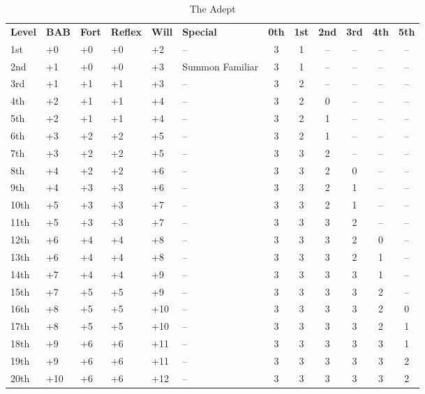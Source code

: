 \begin{table}[htb]
\caption{The Adept}
\centering
\begin{tabular}{*{6}{l}*{6}{c}}
\textbf{Level} & \textbf{BAB} & \textbf{Fort} & \textbf{Reflex} & \textbf{Will} & \textbf{Special} & \textbf{0th} & \textbf{1st} & \textbf{2nd} & \textbf{3rd} & \textbf{4th} & \textbf{5th}\\
1st & +0 & +0 & +0 & +2 & -- & 3 & 1 & -- & -- & -- & -- \\
2nd & +1 & +0 & +0 & +3 & Summon Familiar & 3 & 1 & -- & -- & -- & -- \\
3rd & +1 & +1 & +1 & +3 & -- & 3 & 2 & -- & -- & -- & -- \\
4th & +2 & +1 & +1 & +4 & -- & 3 & 2 & 0 & -- & -- & -- \\
5th & +2 & +1 & +1 & +4 & -- & 3 & 2 & 1 & -- & -- & -- \\
6th & +3 & +2 & +2 & +5 & -- & 3 & 2 & 1 & -- & -- & -- \\
7th & +3 & +2 & +2 & +5 & -- & 3 & 3 & 2 & -- & -- & -- \\
8th & +4 & +2 & +2 & +6 & -- & 3 & 3 & 2 & 0 & -- & -- \\
9th & +4 & +3 & +3 & +6 & -- & 3 & 3 & 2 & 1 & -- & -- \\
10th & +5 & +3 & +3 & +7 & -- & 3 & 3 & 2 & 1 & -- & -- \\
11th & +5 & +3 & +3 & +7 & -- & 3 & 3 & 3 & 2 & -- & -- \\
12th & +6 & +4 & +4 & +8 & -- & 3 & 3 & 3 & 2 & 0 & -- \\
13th & +6 & +4 & +4 & +8 & -- & 3 & 3 & 3 & 2 & 1 & -- \\
14th & +7 & +4 & +4 & +9 & -- & 3 & 3 & 3 & 3 & 1 & -- \\
15th & +7 & +5 & +5 & +9 & -- & 3 & 3 & 3 & 3 & 2 & -- \\
16th & +8 & +5 & +5 & +10 & -- & 3 & 3 & 3 & 3 & 2 & 0 \\
17th & +8 & +5 & +5 & +10 & -- & 3 & 3 & 3 & 3 & 2 & 1 \\
18th & +9 & +6 & +6 & +11 & -- & 3 & 3 & 3 & 3 & 3 & 1 \\
19th & +9 & +6 & +6 & +11 & -- & 3 & 3 & 3 & 3 & 3 & 2 \\
20th & +10 & +6 & +6 & +12 & -- & 3 & 3 & 3 & 3 & 3 & 2 \\
\end{tabular}
\end{table}

\ClassFeatures


